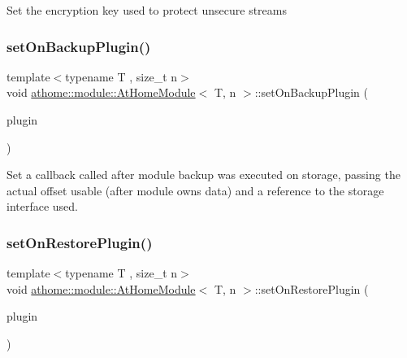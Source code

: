 Set the encryption key used to protect unsecure streams \mbox{\label{classathome_1_1module_1_1_at_home_module_af7e6ed7d4dc72c0cef209704fab0e3af}} 
\subsubsection{\texorpdfstring{set\+On\+Backup\+Plugin()}{setOnBackupPlugin()}}
{\footnotesize\ttfamily template$<$typename T , size\+\_\+t n$>$ \\
void \mbox{\hyperlink{classathome_1_1module_1_1_at_home_module}{athome\+::module\+::\+At\+Home\+Module}}$<$ T, n $>$\+::set\+On\+Backup\+Plugin (\begin{DoxyParamCaption}\item[{At\+Home\+Storage\+Plugin}]{plugin }\end{DoxyParamCaption})\hspace{0.3cm}{\ttfamily [inline]}}

Set a callback called after module backup was executed on storage, passing the actual offset usable (after module owns data) and a reference to the storage interface used. \mbox{\label{classathome_1_1module_1_1_at_home_module_ae359941a4f2e571a052a30916a306e48}} 
\subsubsection{\texorpdfstring{set\+On\+Restore\+Plugin()}{setOnRestorePlugin()}}
{\footnotesize\ttfamily template$<$typename T , size\+\_\+t n$>$ \\
void \mbox{\hyperlink{classathome_1_1module_1_1_at_home_module}{athome\+::module\+::\+At\+Home\+Module}}$<$ T, n $>$\+::set\+On\+Restore\+Plugin (\begin{DoxyParamCaption}\item[{At\+Home\+Storage\+Plugin}]{plugin }\end{DoxyParamCaption})\hspace{0.3cm}{\ttfamily [inline]}}

